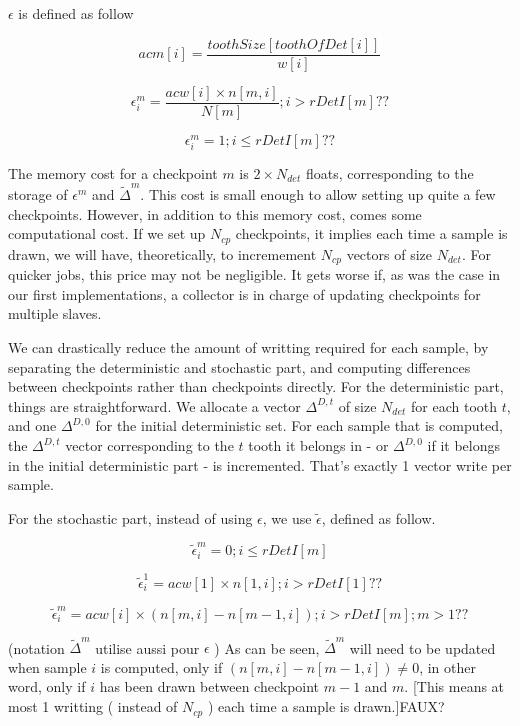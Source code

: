 $\epsilon$ is defined as follow

$$acm[i] = \frac{toothSize[toothOfDet[i]]}{w[i]}$$


$$\epsilon^m_i = \frac{acw[i] \times n[m,i]}{N[m]}  ; i>rDetI[m] ??$$

$$\epsilon^m_i = 1 ; i \leq rDetI[m] ??$$

The memory cost for a checkpoint $m$ is $2 \times N_{det}$ floats, corresponding to the storage of $\epsilon^m$ and $\tilde \Delta^m$. This cost is small enough to allow setting up quite a few checkpoints. However, in addition to this memory cost, comes some computational cost. If we set up $N_{cp}$ checkpoints, it implies each time a sample is drawn, we will have, theoretically, to incremement $N_{cp}$ vectors of size $N_{det}$. For quicker jobs, this price may not be negligible. It gets worse if, as was the case in our first implementations, a collector is in charge of updating checkpoints for multiple slaves. 


We can drastically reduce the amount of writting required for each sample, by separating the deterministic and stochastic part, and computing differences between checkpoints rather than checkpoints directly.
For the deterministic part, things are straightforward. We allocate a vector $\Delta^{D,t}$ of size $N_{det}$ for each tooth $t$, and one $\Delta^{D,0}$ for the initial deterministic set. For each sample that is computed, the $\Delta^{D,t}$ vector corresponding to the $t$ tooth it belongs in - or $\Delta^{D,0}$ if it belongs in the initial deterministic part - is incremented. That's exactly 1 vector write per sample.

For the stochastic part, instead of using $\epsilon$, we use $\tilde \epsilon$, defined as follow.

$$\tilde \epsilon^m_i = 0 ; i \leq rDetI[m]$$

$$\tilde \epsilon^1_i = acw[1] \times n[1,i]  ; i>rDetI[1] ??$$

$$\tilde \epsilon^m_i = acw[i] \times (n[m,i]-n[m-1,i])  ; i>rDetI[m]; m>1 ??$$

(notation  $\tilde \Delta^m$ utilise aussi pour $\epsilon$ )
As can be seen, $\tilde \Delta^m$ will need to be updated when sample $i$ is computed, only if $(n[m,i]-n[m-1,i]) \neq 0$, in other word, only if $i$ has been drawn between checkpoint $m-1$ and $m$. [This means at most 1 writting ( instead of $N_{cp}$ ) each time a sample is drawn.]FAUX? 

